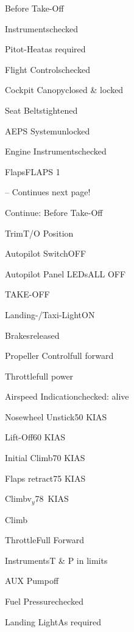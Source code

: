 \begin{checklist}{Before Take-Off}
  \item{Instruments}{checked}
  \item{Pitot-Heat}{as required}
  \item{Flight Controls}{checked}
  \item{Cockpit Canopy}{closed \& locked}
  \item{Seat Belts}{tightened}
  \item{AEPS System}{unlocked}
  \item{Engine Instruments}{checked}
  \item{Flaps}{FLAPS 1}

-- Continues next page!
\end{checklist}
\begin{checklist}{Continue: Before Take-Off}
  \item{Trim}{T/O Position}
  \item{Autopilot Switch}{OFF}
  \item{Autopilot Panel LEDs}{ALL OFF}
\end{checklist}

\begin{checklist}{TAKE-OFF}
  \item{Landing-/Taxi-Light}{ON}
  \item{Brakes}{released}
  \item{Propeller Control}{full forward}
  \item{Throttle}{full power}
  \item{Airspeed Indication}{checked: alive}
  \item{Nosewheel Unstick}{50 KIAS}
  \item{Lift-Off}{60 KIAS}
  \item{Initial Climb}{70 KIAS}
  \item{Flaps retract}{75 KIAS}
  \item{Climb}{v$_{y}$78~KIAS} 
\end{checklist}

\begin{checklist}{Climb}
  \item{Throttle}{Full Forward}
  \item{Instruments}{T \& P in limits}
  \item{AUX Pump}{off}
  \item{Fuel Pressure}{checked}
  \item{Landing Light}{As required}
\end{checklist}

